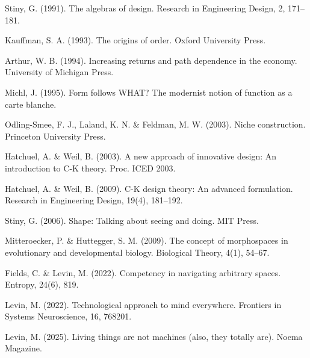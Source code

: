 \documentclass[10pt]{article}
\begin{document}
Stiny, G. (1991). The algebras of design. Research in Engineering Design, 2, 171–181.




Kauffman, S. A. (1993). The origins of order. Oxford University Press.




Arthur, W. B. (1994). Increasing returns and path dependence in the economy. University of Michigan Press.




Michl, J. (1995). Form follows WHAT? The modernist notion of function as a carte blanche.




Odling-Smee, F. J., Laland, K. N. \& Feldman, M. W. (2003). Niche construction. Princeton University Press.




Hatchuel, A. \& Weil, B. (2003). A new approach of innovative design: An introduction to C-K theory. Proc. ICED 2003.




Hatchuel, A. \& Weil, B. (2009). C-K design theory: An advanced formulation. Research in Engineering Design, 19(4), 181–192.




Stiny, G. (2006). Shape: Talking about seeing and doing. MIT Press.




Mitteroecker, P. \& Huttegger, S. M. (2009). The concept of morphospaces in evolutionary and developmental biology. Biological Theory, 4(1), 54–67.




Fields, C. \& Levin, M. (2022). Competency in navigating arbitrary spaces. Entropy, 24(6), 819.




Levin, M. (2022). Technological approach to mind everywhere. Frontiers in Systems Neuroscience, 16, 768201.




Levin, M. (2025). Living things are not machines (also, they totally are). Noema Magazine.
\end{document}
